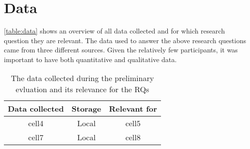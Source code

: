 \chapter{Data}
\label{chapter:data}
\autoref{table:data} shows an overview of all data collected and for which research question they are relevant. The data used to answer the above research questions came from three different sources. Given the relatively few participants, it was important to have both quantitative and qualitative data.

\begin{table}[h]
    \centering
    \begin{tabular}{ |c|c|c| }
        \hline
        Data collected & Storage & Relevant for \\
        \hline
        cell4          & Local   & cell5        \\
        cell7          & Local   & cell8        \\
        \hline
    \end{tabular}
    \caption{The data collected during the preliminary evluation and its relevance for the RQs}
    \label{table:data}
\end{table}